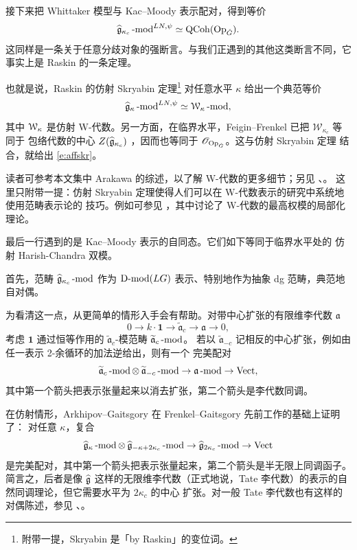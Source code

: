 \ssszh 接下来把 Whittaker 模型与 Kac--Moody 表示配对，得到等价
\begin{equation} \label{e:affskr} \fgc\mod^{LN, \psi} \simeq \QCoh(\Op).
\end{equation}
这同样是一条关于任意分歧对象的强断言。与我们正遇到的其他这类断言不同，它事实上是 Raskin
\cite{whit} 的一条定理。

也就是说，Raskin 的仿射 Skryabin 定理\footnote{附带一提，Skryabin 是「by Raskin」的变位词。}
对任意水平 $\kappa$ 给出一个典范等价
%
\[
  \fgk\mod^{LN, \psi} \simeq \sW\mod,
\]
%
其中 $\sW$ 是仿射 W-代数。另一方面，在临界水平，Feigin--Frenkel 已把 $\mathscr{W}_{\kappa_c}$ 等同于
包络代数的中心 $Z(\fgc)$ \cite{feiginfrenkel91}，因而也等同于 $\OO_{\Op}$。这与仿射 Skryabin 定理
结合，就给出 \eqref{e:affskr}。

\begin{re} 读者可参考本文集中 Arakawa 的综述，以了解 W-代数的更多细节；另见 \cite{araintro}、\cite{fbz}。
这里只附带一提：仿射 Skryabin 定理使得人们可以在 W-代数表示的研究中系统地使用范畴表示论的
技巧。例如可参见 \cite{locw}，其中讨论了 W-代数的最高权模的局部化理论。
\end{re}

\ssszh \label{ss:affhc}最后一行遇到的是 Kac--Moody 表示的自同态。它们如下等同于临界水平处的
仿射 Harish-Chandra 双模。

首先，范畴 $\fgc\mod$ 作为 $\Dmod(LG)$ 表示、特别地作为抽象 dg 范畴，典范地自对偶。

为看清这一点，从更简单的情形入手会有帮助。对带中心扩张的有限维李代数 $\mathfrak{a}$
%
\[
0 \rightarrow k \cdot \mathbf{1} \rightarrow \widetilde{\mathfrak{a}}_c
\rightarrow \mathfrak{a} \rightarrow 0,
\]
%
考虑 $\mathbf{1}$ 通过恒等作用的 $\widetilde{\mathfrak{a}}_c$-模范畴 $\widetilde{\mathfrak{a}}_c\mod$。
若以 $\widetilde{\mathfrak{a}}_{-c}$ 记相反的中心扩张，例如由任一表示 2-余循环的加法逆给出，则有一个
完美配对
%
\[
\widetilde{\mathfrak{a}}_c\mod \otimes \hspace{.7mm}
\widetilde{\mathfrak{a}}_{-c}\mod \rightarrow \mathfrak{a}\mod \rightarrow
\Vect,
\]
%
其中第一个箭头把表示张量起来以消去扩张，第二个箭头是李代数同调。

在仿射情形，Arkhipov--Gaitsgory \cite{ag} 在 Frenkel--Gaitsgory \cite{fg06loc} 先前工作的基础上证明了：
对任意 $\kappa$，复合
%
\[
\fgk\mod \otimes \hspace{.7mm} \widehat{\fg}_{-\kappa + 2\kappa_c}\mod
\rightarrow \widehat{\fg}_{2 \kappa_c}\mod \rightarrow \Vect
\]
%
是完美配对，其中第一个箭头把表示张量起来，第二个箭头是半无限上同调函子。简言之，后者是像 $\gk$
这样的无限维李代数（正式地说，Tate 李代数）的表示的自然同调理论，但它需要水平为 $2\kappa_c$ 的中心
扩张。对一般 Tate 李代数也有这样的对偶陈述，参见 \cite{mys}、\cite{lpw}。

